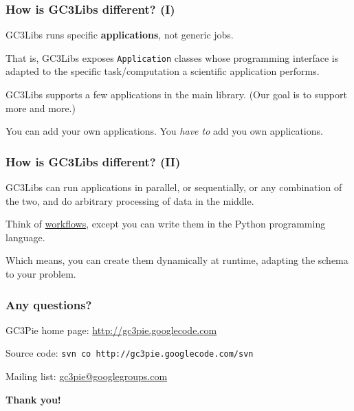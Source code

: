 \documentclass[presentation]{beamer}
\newcommand{\largeskip}{\vspace{1em}}
\def\+{\largeskip}
\begin{document}
\begin{frame}
\frametitle{How is GC3Libs different? (I)}
\label{sec:22}

  GC3Libs runs specific \textbf{applications}, not generic jobs.

  That is, GC3Libs exposes \texttt{Application} classes whose programming
  interface is adapted to the specific task/computation a scientific
  application performs.

  GC3Libs supports a few applications in the main library.  (Our goal
  is to support more and more.)

  You can add your own applications.  You \emph{have to} add you own
  applications. 
\end{frame}

\begin{frame}
\frametitle{How is GC3Libs different? (II)}
\label{sec:23}

  GC3Libs can run applications in parallel, or sequentially, or any
  combination of the two, and do arbitrary processing of data in the
  middle.

  Think of
  \href{http://en.wikipedia.org/wiki/Scientific_workflow_system}{workflows},
  except you can write them in the Python programming language.

  Which means, you can create them dynamically at runtime, adapting
  the schema to your problem.
\end{frame}

\begin{frame}
  \frametitle{Any questions?}
  \label{sec:24}
  
  \begin{center}
    GC3Pie home page: \href{http://gc3pie.googlecode.com}{http://gc3pie.googlecode.com}
    
    Source code: \texttt{svn co http://gc3pie.googlecode.com/svn}
    
    Mailing list: \href{mailto:gc3pie@googlegroups.com}{gc3pie@googlegroups.com}
    
    \+
    \textbf{Thank you!}
  \end{center}
\end{frame}
\end{document}
